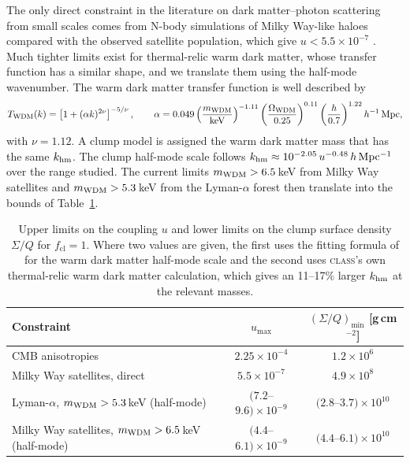 \documentclass[11pt,a4paper]{article}
\newcommand{\cl}{\mathrm{cl}}
\begin{document}
The only direct constraint in the literature on dark matter--photon scattering from small scales comes from N-body simulations of Milky Way-like haloes compared with the observed satellite population, which give $u < 5.5\times10^{-7}$ \citep{Boehm2014}. Much tighter limits exist for thermal-relic warm dark matter, whose transfer function has a similar shape, and we translate them using the half-mode wavenumber. The warm dark matter transfer function is well described by \citep{Viel2005}
\begin{equation}
T_{\rm WDM}(k) = \left[1 + (\alpha k)^{2\nu}\right]^{-5/\nu},\qquad
\alpha = 0.049\left(\frac{m_{\rm WDM}}{\mathrm{keV}}\right)^{-1.11}\left(\frac{\Omega_{\rm WDM}}{0.25}\right)^{0.11}\left(\frac{h}{0.7}\right)^{1.22}h^{-1}\,\mathrm{Mpc},
\end{equation}
with $\nu = 1.12$. A clump model is assigned the warm dark matter mass that has the same $k_{\rm hm}$. The clump half-mode scale follows $k_{\rm hm}\approx 10^{-2.05}\,u^{-0.48}\,h\,\mathrm{Mpc^{-1}}$ over the range studied. The current limits $m_{\rm WDM} > 6.5\,$keV from Milky Way satellites \citep{Nadler2021} and $m_{\rm WDM}>5.3\,$keV from the Lyman-$\alpha$ forest \citep{Irsic2017} then translate into the bounds of Table~\ref{tab:smallscale}.

\begin{table}
\centering
\caption{Upper limits on the coupling $u$ and lower limits on the clump surface density $\Sigma/Q$ for $f_\cl = 1$. Where two values are given, the first uses the fitting formula of \citet{Viel2005} for the warm dark matter half-mode scale and the second uses \textsc{class}'s own thermal-relic warm dark matter calculation, which gives an 11--17\% larger $k_{\rm hm}$ at the relevant masses.}
\label{tab:smallscale}
\begin{tabular}{lcc}
\toprule
Constraint & $u_{\max}$ & $(\Sigma/Q)_{\min}$ [g\,cm$^{-2}$] \\
\midrule
CMB anisotropies \citep{StadlerBoehm2018} & $2.25\times10^{-4}$ & $1.2\times10^6$ \\
Milky Way satellites, direct \citep{Boehm2014} & $5.5\times10^{-7}$ & $4.9\times10^8$ \\
Lyman-$\alpha$, $m_{\rm WDM}>5.3$\,keV (half-mode) & $(7.2$--$9.6)\times10^{-9}$ & $(2.8$--$3.7)\times10^{10}$ \\
Milky Way satellites, $m_{\rm WDM}>6.5$\,keV (half-mode) & $(4.4$--$6.1)\times10^{-9}$ & $(4.4$--$6.1)\times10^{10}$ \\
\bottomrule
\end{tabular}
\end{table}
\end{document}
